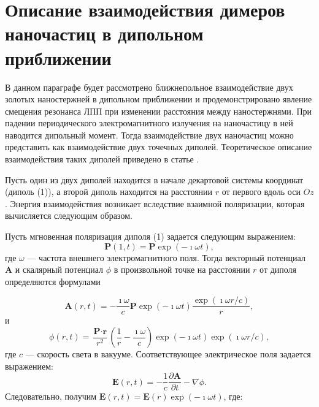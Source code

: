 \section{Описание взаимодействия димеров наночастиц в дипольном приближении}

В данном параграфе будет рассмотрено ближнепольное взаимодействие двух золотых наностержней в дипольном приближении и продемонстрировано явление смещения резонанса ЛПП при изменении расстояния между наностержнями.
При падении периодического электромагнитного излучения на наночастицу в ней наводится дипольный момент. Тогда взаимодействие двух наночастиц можно представить как взаимодействие двух точечных диполей. Теоретическое описание взаимодействия таких диполей приведено в статье \cite{dipoleInteraction}.

Пусть один из двух диполей находится в начале декартовой системы координат (диполь (1)), а второй диполь находится на расстоянии $ r $ от первого вдоль оси $ Oz $. Энергия взаимодействия возникает вследствие взаимной поляризации, которая вычисляется следующим образом.

Пусть мгновенная поляризация диполя (1) задается следующим выражением:
\begin{equation}
\textbf{P} (1, t) = \textbf{P} \exp (-\imath \omega t),
\label{eq:instdipole1}
\end{equation}
где $ \omega $ --- частота внешнего электромагнитного поля.
Тогда векторный потенциал $ \textbf{A} $ и скалярный потенциал $ \phi $ в произвольной точке на расстоянии $ r $ от диполя определяются формулами

\begin{equation}
\textbf{A}(r, t) = - \frac{\imath \omega}{c} \textbf{P} \exp (-\imath \omega t) \frac{\exp (\imath \omega r / c)}{r},
\label{eq:vectorpotential}
\end{equation}
и
\begin{equation}
\phi(r, t) = \frac{\textbf{P} \cdot \textbf{r}}{r^2} \left( \frac{1}{r} - \frac{\imath \omega}{c} \right) \exp (-\imath \omega t) \exp (\imath \omega r / c),
\label{eq:scalarpotential}
\end{equation}
где $ c $ --- скорость света в вакууме. Соответствующее электрическое поля задается выражением:
\begin{equation}
\textbf{E} (r, t) = - \frac{1}{c} \dfrac{\partial \textbf{A}}{\partial t} - \nabla \phi.
\label{eq:elecdipolefromvector}
\end{equation}
Следовательно, получим $ \textbf{E}(r, t) = \textbf{E} (r) \exp(- \imath \omega t) $, где:

